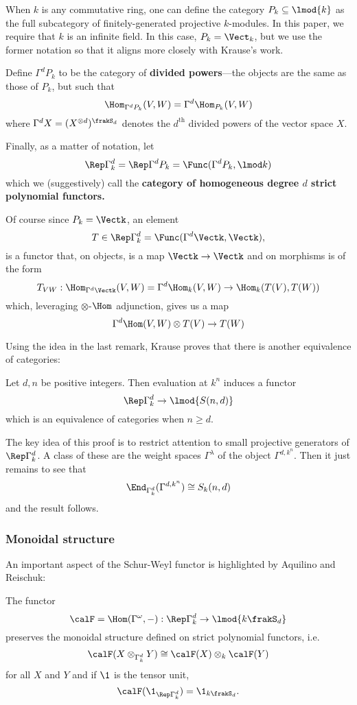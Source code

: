 \documentclass[12pt]{article}
\begin{document}
	\begin{defn}\label{defn:div-powers}
		When $k$ is any commutative ring, one can define the category $P_k\subseteq \lmod{k}$ as the full subcategory of finitely-generated projective $k$-modules.
		In this paper, we require that $k$ is an infinite field. In this case, $P_k=\Vect_k$, but we use the former notation so that 
		it aligns more closely with Krause's work.
	
		Define $\Gamma^d P_k$ to be the category of \textbf{divided powers}---the objects are the same as those of $P_k$, but such that 
		\[\Hom_{\Gamma^dP_k}(V,W)=\Gamma^d\Hom_{P_k}(V,W)\]
		where $\Gamma^d X=(X^{\otimes d})^{\frakS_d}$ denotes the \textbf{$d^{\text{th}}$} divided powers of the vector space $X$.
	
		Finally, as a matter of notation, let 
		\[\Rep\Gamma^d_k=\Rep\Gamma^dP_k=\Func(\Gamma^dP_k,\lmod k)\]
		which we (suggestively) call the \textbf{category of homogeneous degree $d$ strict polynomial functors.}
	\end{defn}
	\begin{rmk}\label{rmk:action}
		Of course since $P_k=\Vectk$, an element
		\[T\in\Rep\Gamma^d_k=\Func(\Gamma^d\Vectk,\Vectk),\]
		is a functor that, on objects, is a map $\Vectk\to \Vectk$ and on morphisms is of the form 
		\[T_{VW}:\Hom_{\Gamma^d\Vectk}(V,W)=\Gamma^d\Hom_k(V,W)\to \Hom_k(T(V),T(W))\]
		which, leveraging $\otimes$-$\Hom$ adjunction, gives us a map 
		\[\Gamma^d\Hom(V,W)\otimes T(V)\to T(W)\]
	\end{rmk}
	Using the idea in the last remark, Krause proves that there is another equivalence of categories:
	\begin{thm}
		Let $d,n$ be positive integers. Then evaluation at $k^n$ induces a functor 
		\[\Rep\Gamma^d_k\to \lmod{S(n,d)}\]
		which is an equivalence of categories when $n\ge d$.
	\end{thm}
	The key idea of this proof is to restrict attention to small projective generators of $\Rep\Gamma^d_k$. A class of these 
	are the weight spaces $\Gamma^\lambda$ of the object $\Gamma^{d,k^n}$. Then it just remains to see that 
	\[\End_{\Gamma^d_k}(\Gamma^{d,k^n})\cong S_k(n,d)\]
	and the result follows.	

		\subsubsection{Monoidal structure}
		An important aspect of the Schur-Weyl functor is highlighted by Aquilino and Reischuk:
		\begin{thm}
			The functor 
			\[\calF=\Hom(\Gamma^\omega,-):\Rep\Gamma^d_k\to \lmod{k\frakS_d}\]
			preserves the monoidal structure defined on strict polynomial functors, i.e.
			\[\calF(X\otimes_{\Gamma_k^d}Y)\cong\calF(X)\otimes_k\calF(Y)\]
			for all $X$ and $Y$ and if $\1$ is the tensor unit, 
			\[\calF(\1_{\Rep\Gamma^d_k})=\1_{k\frakS_d}.\]
		\end{thm}
\end{document}
